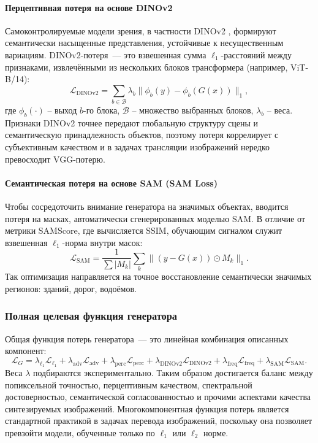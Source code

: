 \paragraph{Перцептивная потеря на основе DINOv2}
Самоконтролируемые модели зрения, в частности DINOv2 \cite{oquab2023dinov2}, формируют семантически насыщенные представления, устойчивые к несущественным вариациям.
DINOv2-потеря~--- это взвешенная сумма $\ell_1$-расстояний между признаками, извлечёнными из нескольких блоков трансформера (например, ViT-B/14):
\begin{equation}
\mathcal{L}_{\text{DINOv2}} = \sum_{b \in \mathcal{B}} \lambda_b \bigl\| \phi_b(y) - \phi_b(G(x)) \bigr\|_1,
\label{eq:dinov2_loss}
\end{equation}
где $\phi_b(\cdot)$ -- выход $b$-го блока, $\mathcal{B}$ -- множество выбранных блоков, $\lambda_b$ -- веса. Признаки DINOv2 точнее передают глобальную структуру сцены и семантическую принадлежность объектов, поэтому потеря коррелирует с субъективным качеством и в задачах трансляции изображений нередко превосходит VGG-потерю.

\paragraph{Семантическая потеря на основе SAM (SAM Loss)}
Чтобы сосредоточить внимание генератора на значимых объектах, вводится потеря на масках, автоматически сгенерированных моделью SAM.
В отличие от метрики SAMScore, где вычисляется SSIM, обучающим сигналом служит взвешенная $\ell_1$-норма внутри масок:
\begin{equation}
\mathcal{L}_{\text{SAM}} = \frac{1}{\sum |M_k|} \sum_k \bigl\| (y - G(x)) \odot M_k \bigr\|_1.
\label{eq:sam_loss}
\end{equation}
Так оптимизация направляется на точное восстановление семантически значимых регионов: зданий, дорог, водоёмов.

\subsubsection{Полная целевая функция генератора}
Общая функция потерь генератора~--- это линейная комбинация описанных компонент:
\begin{equation}
\mathcal{L}_G = \lambda_{\ell_1} \mathcal{L}_{\ell_1} + \lambda_{\text{adv}} \mathcal{L}_{\text{adv}} + \lambda_{\text{perc}} \mathcal{L}_{\text{perc}} + \lambda_{\text{DINOv2}} \mathcal{L}_{\text{DINOv2}} + \lambda_{\text{freq}} \mathcal{L}_{\text{freq}} + \lambda_{\text{SAM}} \mathcal{L}_{\text{SAM}}.
\label{eq:loss_function}
\end{equation}
Веса $\lambda$ подбираются экспериментально.
Таким образом достигается баланс между попиксельной точностью, перцептивным качеством, спектральной достоверностью, семантической согласованностью и прочими аспектами качества синтезируемых изображений.
Многокомпонентная функция потерь является стандартной практикой в задачах перевода изображений, поскольку она позволяет превзойти модели, обученные только по $\ell_1$ или $\ell_2$ норме.

